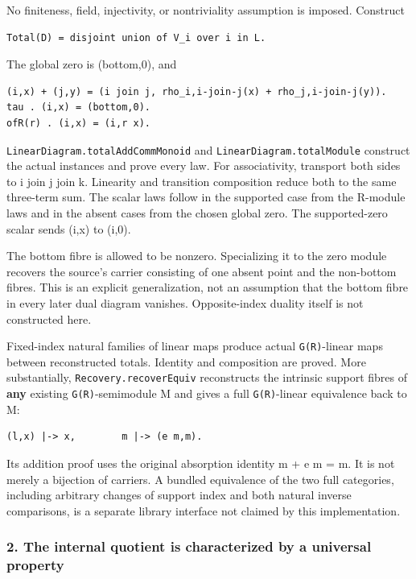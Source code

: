 No finiteness, field, injectivity, or nontriviality assumption is imposed. Construct

\begin{verbatim}
Total(D) = disjoint union of V_i over i in L.
\end{verbatim}

The global zero is (bottom,0), and

\begin{verbatim}
(i,x) + (j,y) = (i join j, rho_i,i-join-j(x) + rho_j,i-join-j(y)).
tau . (i,x) = (bottom,0).
ofR(r) . (i,x) = (i,r x).
\end{verbatim}

\nolinkurl{LinearDiagram.totalAddCommMonoid} and \nolinkurl{LinearDiagram.totalModule} construct the
actual instances and prove every law. For associativity, transport both sides to i join j join k.
Linearity and transition composition reduce both to the same three-term sum. The scalar laws follow
in the supported case from the R-module laws and in the absent cases from the chosen global zero.
The supported-zero scalar sends (i,x) to (i,0).

The bottom fibre is allowed to be nonzero. Specializing it to the zero module recovers the source's
carrier consisting of one absent point and the non-bottom fibres. This is an explicit
generalization, not an assumption that the bottom fibre in every later dual diagram vanishes.
Opposite-index duality itself is not constructed here.

Fixed-index natural families of linear maps produce actual \nolinkurl{G(R)}-linear maps between
reconstructed totals. Identity and composition are proved. More substantially,
\nolinkurl{Recovery.recoverEquiv} reconstructs the intrinsic support fibres of \textbf{any} existing
\nolinkurl{G(R)}-semimodule M and gives a full \nolinkurl{G(R)}-linear equivalence back to M:

\begin{verbatim}
(l,x) |-> x,        m |-> (e m,m).
\end{verbatim}

Its addition proof uses the original absorption identity m + e m = m. It is not merely a bijection
of carriers. A bundled equivalence of the two full categories, including arbitrary changes of
support index and both natural inverse comparisons, is a separate library interface not claimed by
this implementation.

\subsubsection{2. The internal quotient is characterized by a universal
property}\label{derived_main:the-internal-quotient-is-characterized-by-a-universal-property}

